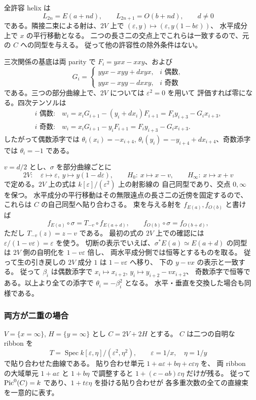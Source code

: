 全許容 helix は
\[
 L_{2n}=E(a+nd),\qquad L_{2n+1}=O(b+nd),\qquad d\ne0
\]
である。隣接二束による射は、$2V$ 上で
$(\varepsilon,y)\mapsto(\varepsilon,y(1-b\varepsilon))$、
水平成分上で $x$ の平行移動となる。
二つの長さ二の交点上でこれらは一致するので、元の $C$ への同型を与える。
従って他の許容性の除外条件はない。

三次関係の基底は両 parity で $F_i=yxx-xxy$、および
\[
 G_i=
 \begin{cases}
 yyx-xyy+dxyx,&i\text{ 偶数},\\
 yyx-xyy-dxxy,&i\text{ 奇数}
 \end{cases}
\]
である。三つの部分曲線上で、$2V$ については $\varepsilon^2=0$ を用いて
評価すれば零になる。四次テンソルは
\[
 \begin{array}{ll}
 i\text{ 偶数}:&w_i=x_iG_{i+1}-(y_i+dx_i)F_{i+1}
                      =F_i y_{i+3}-G_i x_{i+3},\\
 i\text{ 奇数}:&w_i=x_iG_{i+1}-y_iF_{i+1}
                      =F_i y_{i+3}-G_i x_{i+3}.
 \end{array}
\]
したがって偶数添字では $\theta_i(x_i)=-x_{i+4}$,
$\theta_i(y_i)=-y_{i+4}+dx_{i+4}$、奇数添字では $\theta_i=-1$ である。

$v=d/2$ とし、$\sigma$ を部分曲線ごとに
\[
 2V:\quad \varepsilon\mapsto\varepsilon,\ y\mapsto y(1-d\varepsilon),
 \qquad
 H_0:\ x\mapsto x-v,
 \qquad
 H_\infty:\ x\mapsto x+v
\]
で定める。$2V$ 上の式は $k[\varepsilon]/(\varepsilon^2)$ 上の射影線の
自己同型であり、交点 $0,\infty$ を保つ。
水平成分の平行移動はその無限遠点の長さ二の近傍を固定するので、
これらは $C$ の自己同型へ貼り合わさる。
束を与える射を $f_{E(a)},f_{O(b)}$ と書けば
\[
 f_{E(a)}\circ\sigma=T_{-v}\circ f_{E(a+d)},
 \qquad
 f_{O(b)}\circ\sigma=f_{O(b+d)},
\]
ただし $T_{-v}(z)=z-v$ である。
最初の式の $2V$ 上での確認には
$\varepsilon/(1-v\varepsilon)=\varepsilon$ を使う。
切断の表示でいえば、$\sigma^*E(a)\simeq E(a+d)$ の同型は
$2V$ 側の自明化を $1-v\varepsilon$ 倍し、
両水平成分側では恒等とするものを取る。
従って生の引き戻しの $2V$ 成分 $1$ は $1-v\varepsilon$ へ移り、
下の $y-vx$ の表示と一致する。
従って $\beta_i$ は偶数添字で
$x_i\mapsto x_{i+2}$, $y_i\mapsto y_{i+2}-v x_{i+2}$、
奇数添字で恒等である。以上より全ての添字で $\theta_i=-\beta_i^2$ となる。
水平・垂直を交換した場合も同様である。

\subsubsection{両方が二重の場合}

$V=\{x=\infty\}$, $H=\{y=\infty\}$ とし $C=2V+2H$ とする。
$C$ は二つの自明な ribbon を
\[
 T=\operatorname{Spec} k[\varepsilon,\eta]/(\varepsilon^2,\eta^2),
 \qquad\varepsilon=1/x,\quad\eta=1/y
\]
で貼り合わせた曲線である。
貼り合わせ単元 $1+a\varepsilon+b\eta+c\varepsilon\eta$ を、
両 ribbon の大域単元 $1+a\varepsilon$ と $1+b\eta$ で調整すると
$1+(c-ab)\varepsilon\eta$ だけが残る。
従って $\operatorname{Pic}^0(C)=k$ であり、$1+t\varepsilon\eta$ を掛ける貼り合わせが
各多重次数の全ての直線束を一意的に表す。

